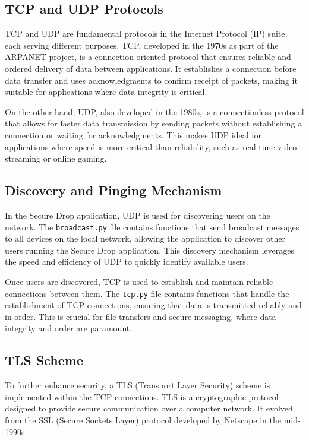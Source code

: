 \documentclass[12pt]{article}
\begin{document}
\subsection{TCP and UDP Protocols}
TCP and UDP are fundamental protocols in the Internet Protocol (IP) suite, each serving different purposes. TCP, developed in the 1970s as part of the ARPANET project, is a connection-oriented protocol that ensures reliable and ordered delivery of data between applications. It establishes a connection before data transfer and uses acknowledgments to confirm receipt of packets, making it suitable for applications where data integrity is critical.

On the other hand, UDP, also developed in the 1980s, is a connectionless protocol that allows for faster data transmission by sending packets without establishing a connection or waiting for acknowledgments. This makes UDP ideal for applications where speed is more critical than reliability, such as real-time video streaming or online gaming.

\subsection{Discovery and Pinging Mechanism}
In the Secure Drop application, UDP is used for discovering users on the network. The \texttt{broadcast.py} file contains functions that send broadcast messages to all devices on the local network, allowing the application to discover other users running the Secure Drop application. This discovery mechanism leverages the speed and efficiency of UDP to quickly identify available users.

Once users are discovered, TCP is used to establish and maintain reliable connections between them. The \texttt{tcp.py} file contains functions that handle the establishment of TCP connections, ensuring that data is transmitted reliably and in order. This is crucial for file transfers and secure messaging, where data integrity and order are paramount.

\subsection{TLS Scheme}
To further enhance security, a TLS (Transport Layer Security) scheme is implemented within the TCP connections. TLS is a cryptographic protocol designed to provide secure communication over a computer network. It evolved from the SSL (Secure Sockets Layer) protocol developed by Netscape in the mid-1990s.
\end{document}
